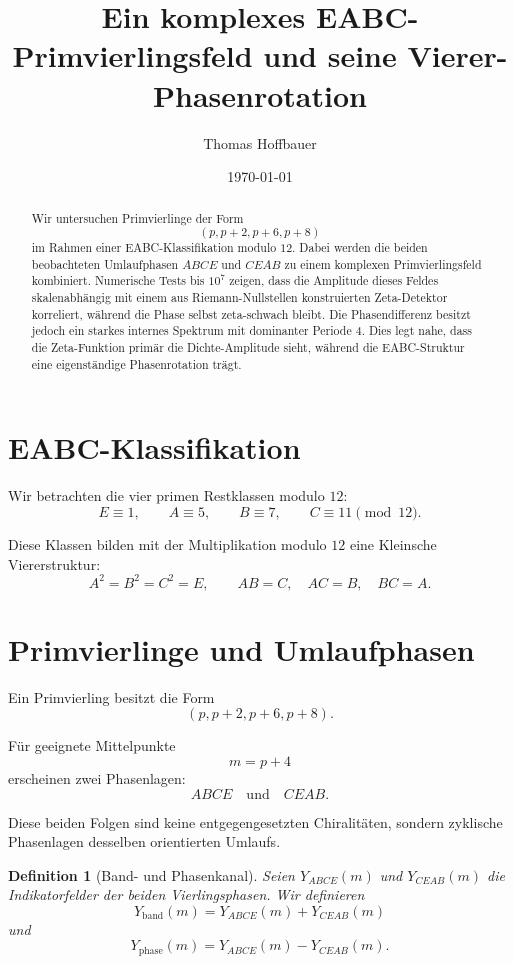 \documentclass[11pt,a4paper]{article}
\title{Ein komplexes EABC-Primvierlingsfeld und seine Vierer-Phasenrotation}
\author{Thomas Hoffbauer}
\date{\today}
\newtheorem{definition}{Definition}
\begin{document}
	
	\maketitle
	
	\begin{abstract}
		Wir untersuchen Primvierlinge der Form
		\[
		(p,p+2,p+6,p+8)
		\]
		im Rahmen einer EABC-Klassifikation modulo \(12\). Dabei werden die beiden beobachteten Umlaufphasen \(ABCE\) und \(CEAB\) zu einem komplexen Primvierlingsfeld kombiniert. Numerische Tests bis \(10^7\) zeigen, dass die Amplitude dieses Feldes skalenabhängig mit einem aus Riemann-Nullstellen konstruierten Zeta-Detektor korreliert, während die Phase selbst zeta-schwach bleibt. Die Phasendifferenz besitzt jedoch ein starkes internes Spektrum mit dominanter Periode \(4\). Dies legt nahe, dass die Zeta-Funktion primär die Dichte-Amplitude sieht, während die EABC-Struktur eine eigenständige Phasenrotation trägt.
	\end{abstract}
	
	\section{EABC-Klassifikation}
	
	Wir betrachten die vier primen Restklassen modulo \(12\):
	\[
	E\equiv 1,\qquad
	A\equiv 5,\qquad
	B\equiv 7,\qquad
	C\equiv 11
	\pmod{12}.
	\]
	
	Diese Klassen bilden mit der Multiplikation modulo \(12\) eine Kleinsche Viererstruktur:
	\[
	A^2=B^2=C^2=E,
	\qquad
	AB=C,\quad AC=B,\quad BC=A.
	\]
	
	\section{Primvierlinge und Umlaufphasen}
	
	Ein Primvierling besitzt die Form
	\[
	(p,p+2,p+6,p+8).
	\]
	
	Für geeignete Mittelpunkte
	\[
	m=p+4
	\]
	erscheinen zwei Phasenlagen:
	\[
	ABCE
	\quad\text{und}\quad
	CEAB.
	\]
	
	Diese beiden Folgen sind keine entgegengesetzten Chiralitäten, sondern zyklische Phasenlagen desselben orientierten Umlaufs.
	
	\begin{definition}[Band- und Phasenkanal]
		Seien \(Y_{ABCE}(m)\) und \(Y_{CEAB}(m)\) die Indikatorfelder der beiden Vierlingsphasen. Wir definieren
		\[
		Y_{\mathrm{band}}(m)
		=
		Y_{ABCE}(m)+Y_{CEAB}(m)
		\]
		und
		\[
		Y_{\mathrm{phase}}(m)
		=
		Y_{ABCE}(m)-Y_{CEAB}(m).
		\]
	\end{definition}
	
\end{document}
